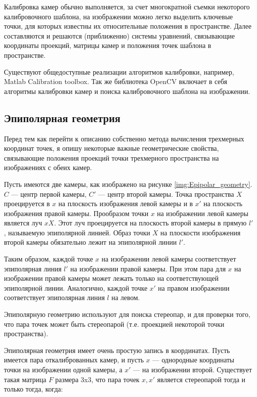 Калибровка камер обычно выполняется, за счет многократной съемки некоторого калибровочного шаблона, на изображении можно легко выделить ключевые точки, для которых известны их относительные положения в пространстве. Далее составляются и решаются (приближенно) системы уравнений, связывающие координаты проекций, матрицы камер и положения точек шаблона в пространстве.

Существуют общедоступные реализации алгоритмов калибровки, например, Matlab Calibration toolbox. Так же библиотека OpenCV включает в себя алгоритмы калибровки камер и поиска калибровочного шаблона на изображении.

\subsection{Эпиполярная геометрия}
Перед тем как перейти к описанию собственно метода вычисления трехмерных координат точек, я опишу некоторые важные геометрические свойства, связывающие положения проекций точки трехмерного пространства на изображениях с обеих камер.

Пусть имеются две камеры, как изображено на рисунке \ref{img:Epipolar_geometry}. $C$ — центр первой камеры, $C'$ — центр второй камеры. Точка пространства $X$ проецируется в $x$ на плоскость изображения левой камеры и в $x'$ на плоскость изображения правой камеры. Прообразом точки $x$ на изображении левой камеры является луч $xX$. Этот луч проецируется на плоскость второй камеры в прямую $l'$, называемую эпиполярной линией. Образ точки $X$ на плоскости изображения второй камеры обязательно лежит на эпиполярной линии $l'$.


Таким образом, каждой точке $x$ на изображении левой камеры соответствует эпиполярная линия $l'$ на изображении правой камеры. При этом пара для $x$ на изображении правой камеры может лежать только на соответствующей эпиполярной линии. Аналогично, каждой точке $x'$ на правом изображении соответствует эпиполярная линия $l$ на левом.

Эпиполярную геометрию используют для поиска стереопар, и для проверки того, что пара точек может быть стереопарой (т.е. проекцией некоторой точки пространства).

Эпиполярная геометрия имеет очень простую запись в координатах. Пусть имеется пара откалиброванных камер, и пусть $x$ — однородные координаты точки на изображении одной камеры, а $x'$ — на изображении второй. Существует такая матрица $F$ размера 3x3, что пара точек $x, x'$ является стереопарой тогда и только тогда, когда:

